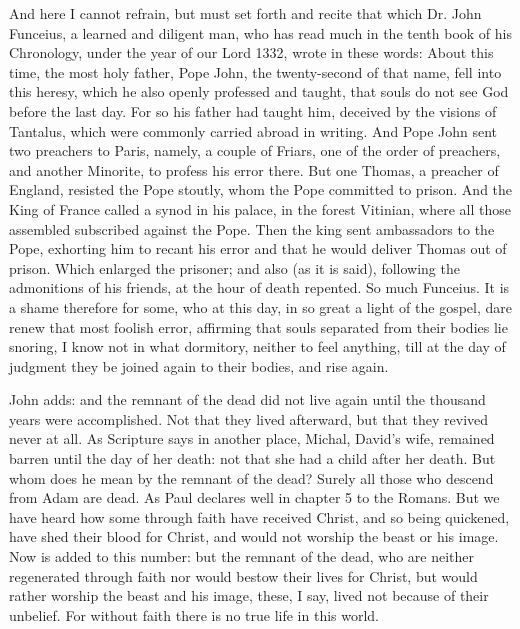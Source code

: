 And here I cannot refrain, but must set forth and recite that which Dr. John Funceius, a learned and diligent man, who has read much in the tenth book of his Chronology, under the year of our Lord 1332, wrote in these words: About this time, the most holy father, Pope John, the twenty-second of that name, fell into this heresy, which he also openly professed and taught, that souls do not see God before the last day. For so his father had taught him, deceived by the visions of Tantalus, which were commonly carried abroad in writing. And Pope John sent two preachers to Paris, namely, a couple of Friars, one of the order of preachers, and another Minorite, to profess his error there. But one Thomas, a preacher of England, resisted the Pope stoutly, whom the Pope committed to prison. And the King of France called a synod in his palace, in the forest Vitinian, where all those assembled subscribed against the Pope. Then the king sent ambassadors to the Pope, exhorting him to recant his error and that he would deliver Thomas out of prison. Which enlarged the prisoner; and also (as it is said), following the admonitions of his friends, at the hour of death repented. So much Funceius. It is a shame therefore for some, who at this day, in so great a light of the gospel, dare renew that most foolish error, affirming that souls separated from their bodies lie snoring, I know not in what dormitory, neither to feel anything, till at the day of judgment they be joined again to their bodies, and rise again.

John adds: and the remnant of the dead did not live again until the thousand years were accomplished. Not that they lived afterward, but that they revived never at all. As Scripture says in another place, Michal, David’s wife, remained barren until the day of her death: not that she had a child after her death. But whom does he mean by the remnant of the dead? Surely all those who descend from Adam are dead. As Paul declares well in chapter 5 to the Romans. But we have heard how some through faith have received Christ, and so being quickened, have shed their blood for Christ, and would not worship the beast or his image. Now is added to this number: but the remnant of the dead, who are neither regenerated through faith nor would bestow their lives for Christ, but would rather worship the beast and his image, these, I say, lived not because of their unbelief. For without faith there is no true life in this world.


